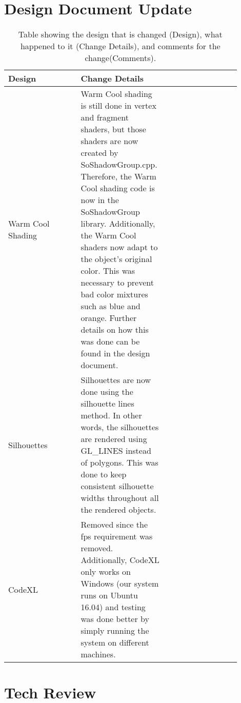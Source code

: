 \documentclass[10pt,journal,compsoc,draftclsnofoot]{IEEEtran}
\begin{document}
\begin{flushleft}
\newpage



\section{Design Document Update}

\begin{center}
\begin{table}[H]
\caption{Table showing the design that is changed (Design), what happened to it (Change Details), and comments for the change(Comments).}
\begin{tabular}{ | p{0.3\linewidth} | p{0.3\linewidth} | p{0.3\linewidth} | }
\hline
\textbf{Design}  & \textbf{Change Details} \\ \hline
Warm Cool Shading & 
Warm Cool shading is still done in vertex and fragment shaders, but those shaders are now created by SoShadowGroup.cpp. 
Therefore, the Warm Cool shading code is now in the SoShadowGroup library. 
Additionally, the Warm Cool shaders now adapt to the object's original color. 
This was necessary to prevent bad color mixtures such as blue and orange. 
Further details on how this was done can be found in the design document. \\ \hline
Silhouettes & Silhouettes are now done using the silhouette lines method. 
In other words, the silhouettes are rendered using GL\_LINES instead of polygons. 
This was done to keep consistent silhouette widths throughout all the rendered objects. \\ \hline
CodeXL & Removed since the fps requirement was removed. 
Additionally, CodeXL only works on Windows (our system runs on Ubuntu 16.04) and testing was done better by simply running the system on different machines. \\ \hline

\end{tabular}
\newline
\label{table:DesignDocumentUpdate}
\end{table}
\end{center}


\newpage

\section{Tech Review}

\newpage




\end{flushleft}
\end{document}
